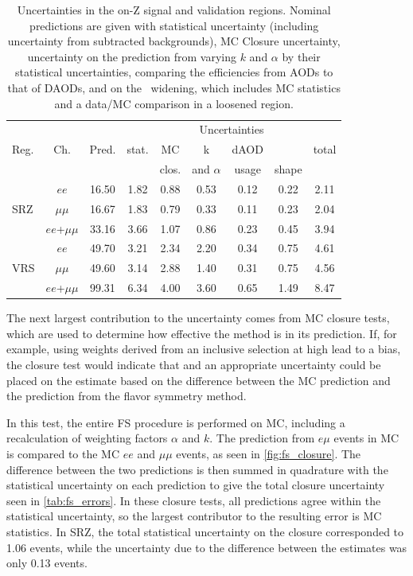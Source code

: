 \begin{table}[!ht]
\begin{center}
 \begin{tabular}{lcc|cccccc}
 \hline 
 \multirow{3}{*}{Reg.}	& \multirow{3}{*}{Ch.} 	& \multirow{3}{*}{Pred.} & \multicolumn{6}{c}{Uncertainties} \\
   \cline{4-9} 
   		 	& 		 	& 	  		& stat.  		& MC 		& k  			& dAOD 		& \mll  	& total \\
   			& 			& 		 	& 			 	& clos. 	& and $\alpha$	& usage	 	& shape  	& \\
   \hline
   \hline
\multirow{3}{*}{SRZ}
& $ee$ & 16.50 & 1.82 & 0.88 & 0.53 & 0.12 & 0.22 & 2.11 \\ 
& $\mu\mu$ & 16.67 & 1.83 & 0.79 & 0.33 & 0.11 & 0.23 & 2.04 \\ 
& $ee$+$\mu\mu$ & 33.16 & 3.66 & 1.07 & 0.86 & 0.23 & 0.45 & 3.94 \\ 
\hline
\multirow{3}{*}{VRS}
& $ee$ & 49.70 & 3.21 & 2.34 & 2.20 & 0.34 & 0.75 & 4.61 \\ 
& $\mu\mu$ & 49.60 & 3.14 & 2.88 & 1.40 & 0.31 & 0.75 & 4.56 \\ 
& $ee$+$\mu\mu$ & 99.31 & 6.34 & 4.00 & 3.60 & 0.65 & 1.49 & 8.47 \\ 
\hline
 
\hline
\hline
 \end{tabular}
\end{center}
 \caption{
   Uncertainties in the on-Z signal and validation regions. Nominal predictions are given with statistical uncertainty (including uncertainty from subtracted backgrounds), MC Closure uncertainty, uncertainty on the prediction from varying $k$ and $\alpha$ by their statistical uncertainties, comparing the efficiencies from AODs to that of DAODs, and on the \mll~widening, which includes MC statistics and a data/MC comparison in a loosened region.
 }
 \label{tab:fs_errors}
\end{table}

The next largest contribution to the uncertainty comes from \ac{MC} closure tests, which are used to determine how effective the method is in its prediction. If, for example, using weights derived from an inclusive selection at high \met lead to a bias, the closure test would indicate that and an appropriate uncertainty could be placed on the estimate based on the difference between the \ac{MC} prediction and the prediction from the flavor symmetry method. 

In this test, the entire \ac{FS} procedure is performed on \ttbar \ac{MC}, including a recalculation of weighting factors $\alpha$ and $k$. The prediction from $e\mu$ events in \ac{MC} is compared to the \ac{MC} $ee$ and $\mu\mu$ events, as seen in \autoref{fig:fs_closure}. The difference between the two predictions is then summed in quadrature with the statistical uncertainty on each prediction to give the total closure uncertainty seen in \autoref{tab:fs_errors}. In these closure tests, all predictions agree within the statistical uncertainty, so the largest contributor to the resulting error is \ac{MC} statistics. In SRZ, the total statistical uncertainty on the closure corresponded to 1.06 events, while the uncertainty due to the difference between the estimates was only 0.13 events. 

